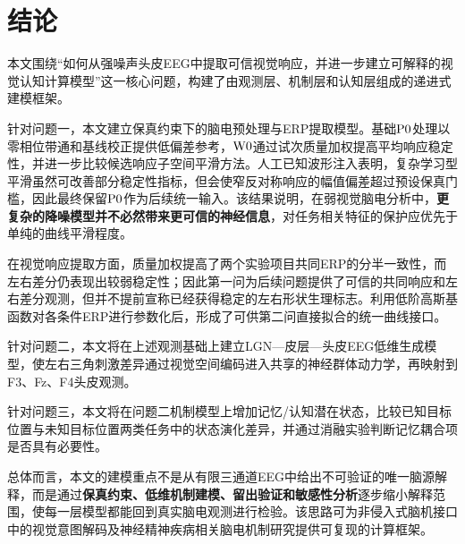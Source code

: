 \section{结论}

本文围绕“如何从强噪声头皮EEG中提取可信视觉响应，并进一步建立可解释的视觉认知计算模型”这一核心问题，构建了由观测层、机制层和认知层组成的递进式建模框架。

针对问题一，本文建立保真约束下的脑电预处理与ERP提取模型。基础$\mathrm{P0}$处理以零相位带通和基线校正提供低偏差参考，$\mathrm{W0}$通过试次质量加权提高平均响应稳定性，并进一步比较候选响应子空间平滑方法。人工已知波形注入表明，复杂学习型平滑虽然可改善部分稳定性指标，但会使窄反对称响应的幅值偏差超过预设保真门槛，因此最终保留$\mathrm{P0}$作为后续统一输入。该结果说明，在弱视觉脑电分析中，\textbf{更复杂的降噪模型并不必然带来更可信的神经信息}，对任务相关特征的保护应优先于单纯的曲线平滑程度。

在视觉响应提取方面，质量加权提高了两个实验项目共同ERP的分半一致性，而左右差分仍表现出较弱稳定性；因此第一问为后续问题提供了可信的共同响应和左右差分观测，但并不提前宣称已经获得稳定的左右形状生理标志。利用低阶高斯基函数对各条件ERP进行参数化后，形成了可供第二问直接拟合的统一曲线接口。

针对问题二，本文将在上述观测基础上建立LGN—皮层—头皮EEG低维生成模型，使左右三角刺激差异通过视觉空间编码进入共享的神经群体动力学，再映射到F3、Fz、F4头皮观测。

针对问题三，本文将在问题二机制模型上增加记忆/认知潜在状态，比较已知目标位置与未知目标位置两类任务中的状态演化差异，并通过消融实验判断记忆耦合项是否具有必要性。

总体而言，本文的建模重点不是从有限三通道EEG中给出不可验证的唯一脑源解释，而是通过\textbf{保真约束、低维机制建模、留出验证和敏感性分析}逐步缩小解释范围，使每一层模型都能回到真实脑电观测进行检验。该思路可为非侵入式脑机接口中的视觉意图解码及神经精神疾病相关脑电机制研究提供可复现的计算框架。
